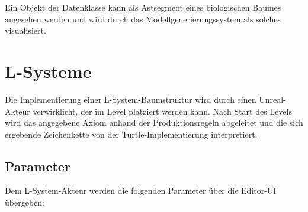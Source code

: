 Ein Objekt der Datenklasse kann als Astsegment eines biologischen Baumes angesehen werden und wird durch das Modellgenerierungssystem als solches visualisiert.

\section{L-Systeme}

Die Implementierung einer L-System-Baumstruktur wird durch einen Unreal-Akteur verwirklicht, der im Level platziert werden kann. Nach Start des Levels wird das angegebene Axiom anhand der Produktionsregeln abgeleitet und die sich ergebende Zeichenkette von der Turtle-Implementierung interpretiert.

\subsection{Parameter}

Dem L-System-Akteur werden die folgenden Parameter über die Editor-UI übergeben:

